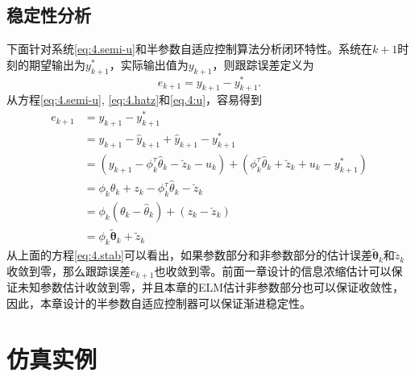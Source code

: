 \subsection{稳定性分析}\label{sect:4.3.2}
下面针对系统\ref{eq:4.semi-u}和半参数自适应控制算法分析闭环特性。系统在$k+1$时刻的期望输出为$y^{*}_{k+1}$，实际输出值为$y_{k+1}$，则跟踪误差定义为
\begin{equation}
e_{k+1} = y_{k+1} - y^{*}_{k+1}.
\end{equation}
从方程\eqref{eq:4.semi-u}, \eqref{eq:4.hatz}和\eqref{eq.4:u}，容易得到
\begin{equation}\label{eq:4.stab}
\begin{split}%
e_{k+1} & = y_{k+1} - y^{*}_{k+1}\\
& = y_{k+1} - \hat{y}_{k+1} + \hat{y}_{k+1} - y^{*}_{k+1}\\
& = (y_{k+1} - \phi_{k}^{\tau}\hat{\theta}_{k} - \breve{z}_{k} - u_{k} )+(\phi_{k}^{\tau}\hat{\theta}_{k} + \breve{z}_{k} + u_{k}  - y^{*}_{k+1})\\
& = \phi_{k}\theta_{k} + z_{k} - \phi_{k}^{\tau}\hat{\theta}_{k} - \breve{z}_{k}\\
& = \phi_{k}(\theta_{k} - \hat{\theta}_{k}) + (z_{k} - \breve{z}_{k})\\
& = \phi_{k}\tilde{\bm{\theta}}_{k}+\tilde{z}_{k}
\end{split}
\end{equation}
从上面的方程\eqref{eq:4.stab}可以看出，如果参数部分和非参数部分的估计误差$\tilde{\bm{\theta}}_{k}$和$\tilde{z}_{k}$收敛到零，那么跟踪误差$e_{k+1}$也收敛到零。前面一章设计的信息浓缩估计可以保证未知参数估计收敛到零，并且本章的ELM估计非参数部分也可以保证收敛性，因此，本章设计的半参数自适应控制器可以保证渐进稳定性。

\section{仿真实例}\label{sect:4.4}

